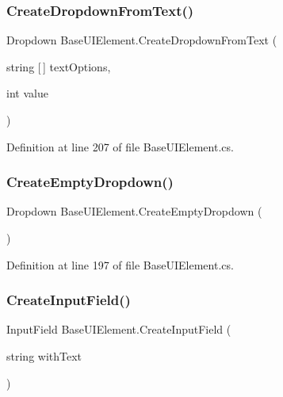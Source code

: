 \subsubsection{\texorpdfstring{Create\+Dropdown\+From\+Text()}{CreateDropdownFromText()}}
{\footnotesize\ttfamily Dropdown Base\+U\+I\+Element.\+Create\+Dropdown\+From\+Text (\begin{DoxyParamCaption}\item[{string \mbox{[}$\,$\mbox{]}}]{text\+Options,  }\item[{int}]{value }\end{DoxyParamCaption})\hspace{0.3cm}{\ttfamily [protected]}}



Definition at line 207 of file Base\+U\+I\+Element.\+cs.

\mbox{\label{class_base_u_i_element_a0c39035955d916aaf1f1259b5775f31d}} 
\subsubsection{\texorpdfstring{Create\+Empty\+Dropdown()}{CreateEmptyDropdown()}}
{\footnotesize\ttfamily Dropdown Base\+U\+I\+Element.\+Create\+Empty\+Dropdown (\begin{DoxyParamCaption}{ }\end{DoxyParamCaption})\hspace{0.3cm}{\ttfamily [protected]}}



Definition at line 197 of file Base\+U\+I\+Element.\+cs.

\mbox{\label{class_base_u_i_element_a66e9971975d8d24b2f59a5f67e498f44}} 
\subsubsection{\texorpdfstring{Create\+Input\+Field()}{CreateInputField()}}
{\footnotesize\ttfamily Input\+Field Base\+U\+I\+Element.\+Create\+Input\+Field (\begin{DoxyParamCaption}\item[{string}]{with\+Text }\end{DoxyParamCaption})\hspace{0.3cm}{\ttfamily [protected]}}



